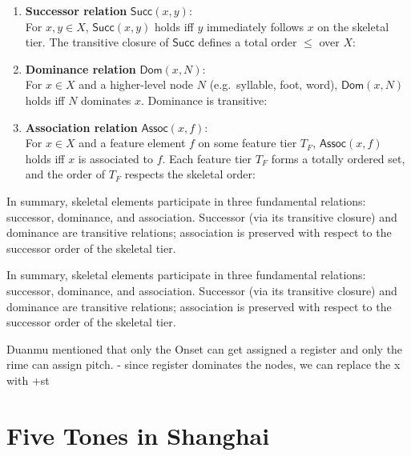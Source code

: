 \documentclass[11pt]{article}
\begin{document}
\begin{enumerate}
    \item \textbf{Successor relation} $\mathsf{Succ}(x,y)$: \\
    For $x,y \in X$, $\mathsf{Succ}(x,y)$ holds iff $y$ immediately follows $x$ on the skeletal tier. 
    The transitive closure of $\mathsf{Succ}$ defines a total order $\leq$ over $X$:

    \item \textbf{Dominance relation} $\mathsf{Dom}(x,N)$: \\
    For $x \in X$ and a higher-level node $N$ (e.g.\ syllable, foot, word), 
    $\mathsf{Dom}(x,N)$ holds iff $N$ dominates $x$. 
    Dominance is transitive:

    \item \textbf{Association relation} $\mathsf{Assoc}(x,f)$: \\
    For $x \in X$ and a feature element $f$ on some feature tier $T_F$, 
    $\mathsf{Assoc}(x,f)$ holds iff $x$ is associated to $f$. 
    Each feature tier $T_F$ forms a totally ordered set, and the order of $T_F$ 
    respects the skeletal order:
\end{enumerate}

In summary, skeletal elements participate in three fundamental relations: 
successor, dominance, and association. 
Successor (via its transitive closure) and dominance are transitive relations; 
association is preserved with respect to the successor order of the skeletal tier.

In summary, skeletal elements participate in three fundamental relations: successor, dominance, and association. 
Successor (via its transitive closure) and dominance are transitive relations; association is preserved with respect to the successor order of the skeletal tier.

Duanmu mentioned that only the Onset can get assigned a register and only the rime can assign pitch. 
- since register dominates the nodes, we can replace the x with +st 

\section{Five Tones in Shanghai}
\end{document}

